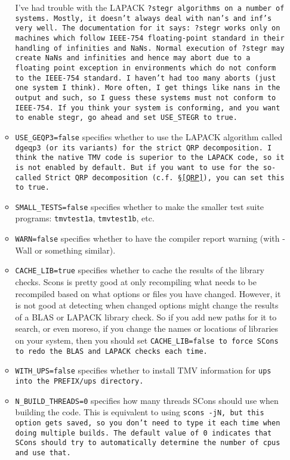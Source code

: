 \begin{enumerate}
\begin{itemize}
I've had trouble with the LAPACK \tt{?stegr} algorithms on a number of systems.  Mostly, it doesn't always deal with \tt{nan}'s and \tt{inf}'s very well.  The documentation for it says:
{\sc ?stegr works only on machines which follow IEEE-754 floating-point standard in their handling of infinities and NaNs. Normal execution of ?stegr may create NaNs and infinities and hence may abort due to a floating point exception in environments which do not conform to the IEEE-754 standard.}  I haven't had too many aborts (just one system I think).  More often, I get things like \tt{nan}s in the output and such, so I guess these systems must not conform to IEEE-754.  If you think your system is conforming, and you want to enable \tt{stegr}, go ahead and set \tt{USE\_STEGR} to \tt{true}.
\item
\texttt{USE\_GEQP3=false} specifies whether to use the LAPACK algorithm called
\tt{dgeqp3} (or its variants) for the strict QRP decomposition.  I think the native TMV code is superior to the LAPACK code, so it is not enabled by default.  But if you want to use for the so-called Strict QRP decomposition (c.f. \S\ref{QRP}), you can set this to \tt{true}.
\item \texttt{SMALL\_TESTS=false} specifies whether to make the smaller test suite programs: \texttt{tmvtest1a}, \texttt{tmvtest1b}, etc. 
\item \texttt{WARN=false} specifies whether to have the compiler report warning (with -Wall or
something similar).
\item \texttt{CACHE\_LIB=true} specifies whether to cache the results of the library checks.  
Scons is pretty good at only recompiling what needs to be recompiled based on what options or files you have changed.  However, it is not good at detecting when changed options might change the results of a BLAS or LAPACK library check.  So if you add new paths for it to search, or even moreso, if you change the names or locations of libraries on your system, then you should set \tt{CACHE\_LIB=false} to force SCons to redo the BLAS and LAPACK checks each time.
\item \texttt{WITH\_UPS=false} specifies whether to install TMV information for \tt{ups} into the \tt{PREFIX/ups} directory.
\item \texttt{N\_BUILD\_THREADS=0} specifies how many threads SCons should use when building the code.  This is equivalent to using \tt{scons -jN}, but this option gets saved, so you don't need to type it each time when doing multiple builds.  The default value of 0 indicates that SCons should try to automatically determine the number of cpus and use that.
\end{itemize}


\end{enumerate}
